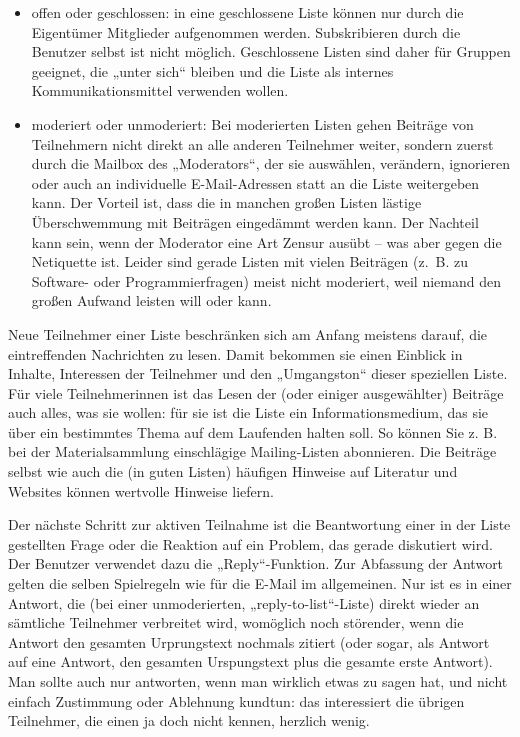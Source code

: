 \documentclass[]{book}
\providecommand{\tightlist}{%
  \setlength{\itemsep}{0pt}\setlength{\parskip}{0pt}}
\theoremstyle{definition}
\theoremstyle{definition}
\theoremstyle{definition}
\theoremstyle{remark}
\begin{document}
\begin{itemize}
\tightlist
\item
  offen oder geschlossen: in eine geschlossene Liste können nur durch
  die Eigentümer Mitglieder aufgenommen werden. Subskribieren durch die
  Benutzer selbst ist nicht möglich. Geschlossene Listen sind daher für
  Gruppen geeignet, die „unter sich`` bleiben und die Liste als internes
  Kommunikationsmittel verwenden wollen.
\item
  moderiert oder unmoderiert: Bei moderierten Listen gehen Beiträge von
  Teilnehmern nicht direkt an alle anderen Teilnehmer weiter, sondern
  zuerst durch die Mailbox des „Moderators``, der sie auswählen,
  verändern, ignorieren oder auch an individuelle E-Mail-Adressen statt
  an die Liste weitergeben kann. Der Vorteil ist, dass die in manchen
  großen Listen lästige Überschwemmung mit Beiträgen eingedämmt werden
  kann. Der Nachteil kann sein, wenn der Moderator eine Art Zensur
  ausübt -- was aber gegen die Netiquette ist. Leider sind gerade Listen
  mit vielen Beiträgen (z.~B. zu Software- oder Programmierfragen) meist
  nicht moderiert, weil niemand den großen Aufwand leisten will oder
  kann.
\end{itemize}

Neue Teilnehmer einer Liste beschränken sich am Anfang meistens darauf,
die eintreffenden Nachrichten zu lesen. Damit bekommen sie einen
Einblick in Inhalte, Interessen der Teilnehmer und den „Umgangston``
dieser speziellen Liste. Für viele Teilnehmerinnen ist das Lesen der
(oder einiger ausgewählter) Beiträge auch alles, was sie wollen: für sie
ist die Liste ein Informationsmedium, das sie über ein bestimmtes Thema
auf dem Laufenden halten soll. So können Sie z. B. bei der
Materialsammlung einschlägige Mailing-Listen abonnieren. Die Beiträge
selbst wie auch die (in guten Listen) häufigen Hinweise auf Literatur
und Websites können wertvolle Hinweise liefern.

Der nächste Schritt zur aktiven Teilnahme ist die Beantwortung einer in
der Liste gestellten Frage oder die Reaktion auf ein Problem, das gerade
diskutiert wird. Der Benutzer verwendet dazu die „Reply``-Funktion. Zur
Abfassung der Antwort gelten die selben Spielregeln wie für die E-Mail
im allgemeinen. Nur ist es in einer Antwort, die (bei einer
unmoderierten, „reply-to-list``-Liste) direkt wieder an sämtliche
Teilnehmer verbreitet wird, womöglich noch störender, wenn die Antwort
den gesamten Urprungstext nochmals zitiert (oder sogar, als Antwort auf
eine Antwort, den gesamten Urspungstext plus die gesamte erste Antwort).
Man sollte auch nur antworten, wenn man wirklich etwas zu sagen hat, und
nicht einfach Zustimmung oder Ablehnung kundtun: das interessiert die
übrigen Teilnehmer, die einen ja doch nicht kennen, herzlich wenig.
\end{document}
